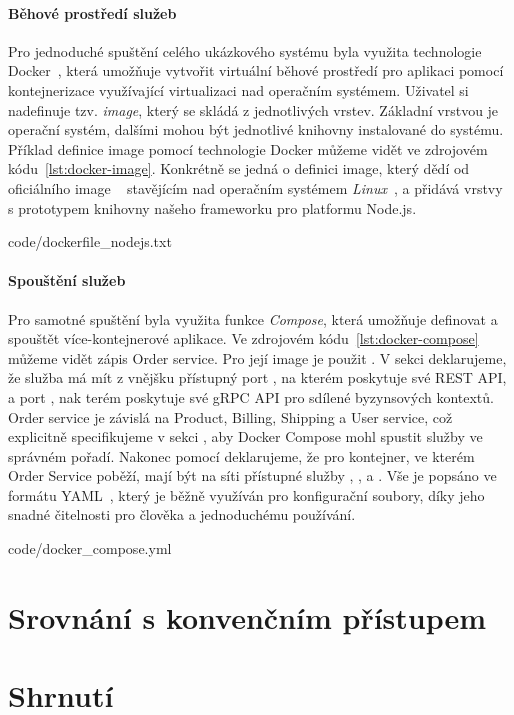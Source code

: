 \paragraph{Běhové prostředí služeb}
Pro jednoduché spuštění celého ukázkového systému byla využita technologie
Docker~\cite{merkel2014docker}, která umožňuje vytvořit virtuální běhové prostředí
pro aplikaci pomocí kontejnerizace využívající virtualizaci nad operačním systémem.
Uživatel si nadefinuje tzv. \textit{image}, který se skládá z jednotlivých vrstev.
Základní vrstvou je operační systém, dalšími mohou být jednotlivé knihovny instalované do systému.
Příklad definice image pomocí technologie Docker můžeme vidět ve zdrojovém
kódu~\ref{lst:docker-image}. Konkrétně se jedná o definici image, který
dědí od oficiálního image ~\cite{dockernodeimage} stavějícím nad operačním systémem \textit{Linux}~\cite{linux},
a přidává vrstvy s prototypem knihovny našeho frameworku pro platformu Node.js.


{code/dockerfile_nodejs.txt}

\paragraph{Spouštění služeb}
Pro samotné spuštění byla využita funkce \textit{Compose}, která umožňuje
definovat a spouštět více-kontejnerové aplikace. Ve zdrojovém kódu~\ref{lst:docker-compose}
můžeme vidět zápis Order service. Pro její image je použit .
V sekci  deklarujeme, že služba má mít z vnějšku přístupný port , na kterém poskytuje své
\gls{REST} \gls{API}, a port , nak terém poskytuje své gRPC \gls{API} pro sdílené byzynsových kontextů. Order service je závislá
na Product, Billing, Shipping a User service, což explicitně specifikujeme v sekci ,
aby Docker Compose mohl spustit služby ve správném pořadí. Nakonec pomocí  deklarujeme,
že pro kontejner, ve kterém Order Service poběží, mají být na síti přístupné služby , ,
 a . Vše je popsáno ve formátu \gls{YAML}~\cite{ben2005yaml}, který je běžně využíván
pro konfigurační soubory, díky jeho snadné čitelnosti pro člověka a jednoduchému používání.


{code/docker_compose.yml}

\section{Srovnání s konvenčním přístupem}


\section{Shrnutí}

